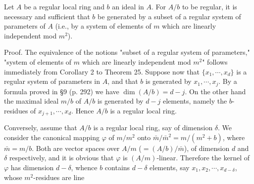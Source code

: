 Let $A$ be a regular local ring and $b$ an ideal in $A$. For $A/b$ to be regular, it is necessary and sufficient that $b$ be generated by a subset of a regular system of parameters of $A$ (i.e., by a system of elements of $m$ which are linearly independent mod $m^2$).

Proof. The equivalence of the notions "subset of a regular system of parameters," "system of elements of $m$ which are linearly independent mod $m^2$" follows immediately from Corollary 2 to Theorem 25. Suppose now that $\{x_1, \cdots, x_d\}$ is a regular system of parameters in $A$, and that $b$ is generated by $x_1, \cdots, x_j$. By a formula proved in §9 (p. 292) we have $\dim (A/b) = d - j$. On the other hand the maximal ideal $m/b$ of $A/b$ is generated by $d - j$ elements, namely the $b$-residues of $x_{j+1}, \cdots, x_d$. Hence $A/b$ is a regular local ring.

Conversely, assume that $A/b$ is a regular local ring, say of dimension $\delta$. We consider the canonical mapping $\varphi$ of $m/m^2$ onto $\bar{m}/\bar{m}^2 = m/(m^2 + b)$, where $\bar{m} = m/b$. Both are vector spaces over $A/m$ ($= (A/b)/\bar{m}$), of dimension $d$ and $\delta$ respectively, and it is obvious that $\varphi$ is $(A/m)$-linear. Therefore the kernel of $\varphi$ has dimension $d - \delta$, whence $b$ contains $d - \delta$ elements, say $x_1, x_2, \cdots, x_{d - \delta}$, whose $m^2$-residues are line